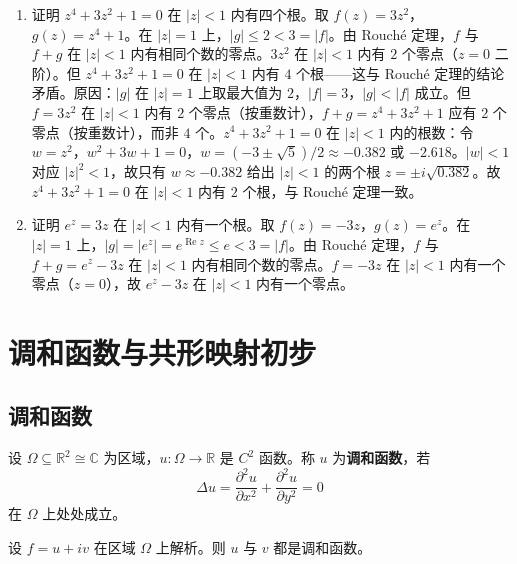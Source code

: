 \begin{example}\label{ex:ca_rouche_application}
\begin{enumerate}[label=(\roman*)]
    \item 证明 $z^4 + 3z^2 + 1 = 0$ 在 $|z| < 1$ 内有四个根。取 $f(z) = 3z^2$，$g(z) = z^4 + 1$。在 $|z| = 1$ 上，$|g| \le 2 < 3 = |f|$。由 Rouché 定理，$f$ 与 $f + g$ 在 $|z| < 1$ 内有相同个数的零点。$3z^2$ 在 $|z| < 1$ 内有 $2$ 个零点（$z = 0$ 二阶）。但 $z^4 + 3z^2 + 1 = 0$ 在 $|z| < 1$ 内有 $4$ 个根——这与 Rouché 定理的结论矛盾。原因：$|g|$ 在 $|z| = 1$ 上取最大值为 $2$，$|f| = 3$，$|g| < |f|$ 成立。但 $f = 3z^2$ 在 $|z| < 1$ 内有 $2$ 个零点（按重数计），$f + g = z^4 + 3z^2 + 1$ 应有 $2$ 个零点（按重数计），而非 $4$ 个。$z^4 + 3z^2 + 1 = 0$ 在 $|z| < 1$ 内的根数：令 $w = z^2$，$w^2 + 3w + 1 = 0$，$w = (-3 \pm \sqrt{5})/2 \approx -0.382$ 或 $-2.618$。$|w| < 1$ 对应 $|z|^2 < 1$，故只有 $w \approx -0.382$ 给出 $|z| < 1$ 的两个根 $z = \pm i\sqrt{0.382}$。故 $z^4 + 3z^2 + 1 = 0$ 在 $|z| < 1$ 内有 $2$ 个根，与 Rouché 定理一致。
    \item 证明 $e^z = 3z$ 在 $|z| < 1$ 内有一个根。取 $f(z) = -3z$，$g(z) = e^z$。在 $|z| = 1$ 上，$|g| = |e^z| = e^{\operatorname{Re} z} \le e < 3 = |f|$。由 Rouché 定理，$f$ 与 $f + g = e^z - 3z$ 在 $|z| < 1$ 内有相同个数的零点。$f = -3z$ 在 $|z| < 1$ 内有一个零点（$z = 0$），故 $e^z - 3z$ 在 $|z| < 1$ 内有一个零点。
\end{enumerate}
\end{example}

\section{调和函数与共形映射初步}

\subsection{调和函数}

\begin{definition}[调和函数]\label{def:ca_harmonic_function}
设 $\Omega \subseteq \mathbb{R}^2 \cong \mathbb{C}$ 为区域，$u: \Omega \to \mathbb{R}$ 是 $C^2$ 函数。称 $u$ 为\textbf{调和函数}，若
\[
\Delta u = \frac{\partial^2 u}{\partial x^2} + \frac{\partial^2 u}{\partial y^2} = 0
\]
在 $\Omega$ 上处处成立。
\end{definition}

\begin{theorem}[解析函数的实部与虚部是调和函数]\label{thm:ca_analytic_implies_harmonic}
设 $f = u + iv$ 在区域 $\Omega$ 上解析。则 $u$ 与 $v$ 都是调和函数。
\end{theorem}

